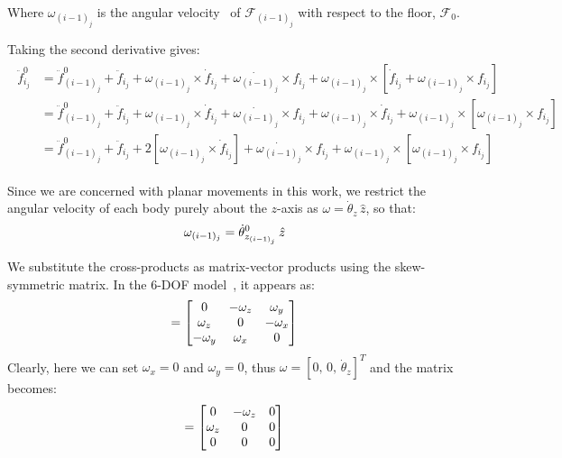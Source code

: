 Where $\omega_{(i-1)_j}$ is the angular velocity~\cite{Ginsberg1984_AdvancedDynamics} of $\mathcal{F}_{(i-1)_j}$ with respect to the floor, $\mathcal{F}_{0}$.

Taking the second derivative gives:
\begin{align}
    \begin{split}
        \ddot{f}^{0}_{i_j} &= \ddot{f}^{0}_{(i-1)_j} + \ddot{f}_{i_j}
        + \omega_{(i-1)_j} \times \dot{f}_{i_j}
        + \dot{\omega_{(i-1)_j}} \times f_{i_j}
        + \omega_{(i-1)_j} \times \left[
            \dot{f}_{i_j} + \omega_{(i-1)_j} \times f_{i_j}
        \right] \\
        &= \ddot{f}^{0}_{(i-1)_j} + \ddot{f}_{i_j}
        + \omega_{(i-1)_j} \times \dot{f}_{i_j}
        + \dot{\omega_{(i-1)_j}} \times f_{i_j}
        + \omega_{(i-1)_j} \times \dot{f}_{i_j}
        + \omega_{(i-1)_j} \times \left[
            \omega_{(i-1)_j} \times f_{i_j}
        \right] \\
        &= \ddot{f}^{0}_{(i-1)_j} + \ddot{f}_{i_j}
        + 2 \left[ \omega_{(i-1)_j} \times \dot{f}_{i_j} \right]
        + \dot{\omega_{(i-1)_j}} \times f_{i_j}
        + \omega_{(i-1)_j} \times \left[
            \omega_{(i-1)_j} \times f_{i_j}
        \right]
    \end{split}
\end{align}

Since we are concerned with planar movements in this work, we restrict the angular velocity of each body purely about the $z$-axis as $\omega = \dot{\theta}_z\,\hat{z}$, so that:
\begin{equation}
    \omega_{(i-1)_j} = \dot{\theta}^{0}_{z_{(i-1)_j}}\,\hat{z} \notag
\end{equation}

We substitute the cross-products as matrix-vector products using the skew-symmetric matrix. In the 6-DOF model~\cite{Al-Rawashdeh2022_Caracterization}, it appears as:
\begin{equation}
    [\omega]
    =
    \begin{bmatrix}
        0 & -\omega_z & \omega_y \\
        \omega_z & 0 & -\omega_x \\
        -\omega_y & \omega_x & 0
    \end{bmatrix}
    \notag
\end{equation}
Clearly, here we can set $\omega_x = 0$ and $\omega_y = 0$, thus $\omega = [0,\, 0,\, \dot{\theta}_z]^T$ and the matrix becomes:
\begin{equation}
    [\omega]
    =
    \begin{bmatrix}
        0 & -\omega_z & 0 \\
        \omega_z & 0 & 0 \\
        0 & 0 & 0
    \end{bmatrix}
    \notag
\end{equation}

